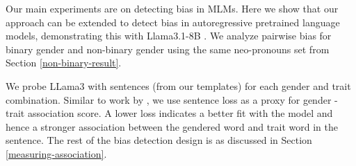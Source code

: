 \noindent Our main experiments are on detecting bias in MLMs.  Here we show that our approach can be extended to detect bias in autoregressive pretrained language models, demonstrating this with Llama3.1-8B \cite{dubey2024llama}.
%
We analyze pairwise bias for binary gender 
and non-binary gender using the same neo-pronouns set from Section \ref{non-binary-result}. 
 

We probe LLama3 with sentences (from our templates) for each gender and trait combination.
%
Similar to work by \citet{hossain-etal-2023-misgendered}, we use sentence loss as a proxy for gender - trait association score. A lower loss indicates a better fit with the model and hence a stronger association between the gendered word and trait word in the sentence. 
%
The rest of the bias detection design is as discussed in Section \ref{measuring-association}.


